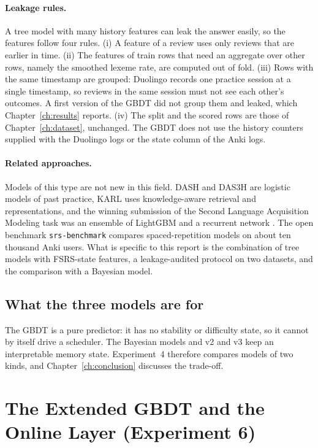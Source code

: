 \paragraph{Leakage rules.}
A tree model with many history features can leak the answer easily, so the features follow four rules.
(i) A feature of a review uses only reviews that are earlier in time. (ii) The features of train rows
that need an aggregate over other rows, namely the smoothed lexeme rate, are computed out of fold.
(iii) Rows with the same timestamp are grouped: Duolingo records one practice session at a single
timestamp, so reviews in the same session must not see each other's outcomes. A first version of the GBDT
did not group them and leaked, which Chapter~\ref{ch:results} reports. (iv) The split and the scored rows are those
of Chapter~\ref{ch:dataset}, unchanged. The GBDT does not use the history counters supplied with the Duolingo logs or the
state column of the Anki logs.

\paragraph{Related approaches.}
Models of this type are not new in this field. DASH \cite{lindsey2014improving} and
DAS3H \cite{choffin2019das3h} are logistic models of past practice, KARL \cite{shu2024karl} uses
knowledge-aware retrieval and representations, and the winning submission of the Second Language
Acquisition Modeling task \cite{settles2018slam} was an ensemble of LightGBM and a recurrent
network \cite{osika2018slam}. The open benchmark \texttt{srs-benchmark} \cite{srsbenchmark} compares
spaced-repetition models on about ten thousand Anki users. What is specific to this report is the combination of tree
models with FSRS-state features, a leakage-audited protocol on two datasets, and the comparison
with a Bayesian model.

\subsection{What the three models are for}
\label{sec:method-improved-purpose}

The GBDT is a pure predictor: it has no stability or difficulty state, so it cannot by itself drive a
scheduler. The Bayesian models and v2 and v3 keep an interpretable memory state. Experiment~4 therefore
compares models of two kinds, and Chapter~\ref{ch:conclusion} discusses the trade-off.

\section{The Extended GBDT and the Online Layer (Experiment 6)}
\label{sec:method-gbdt-ext}

